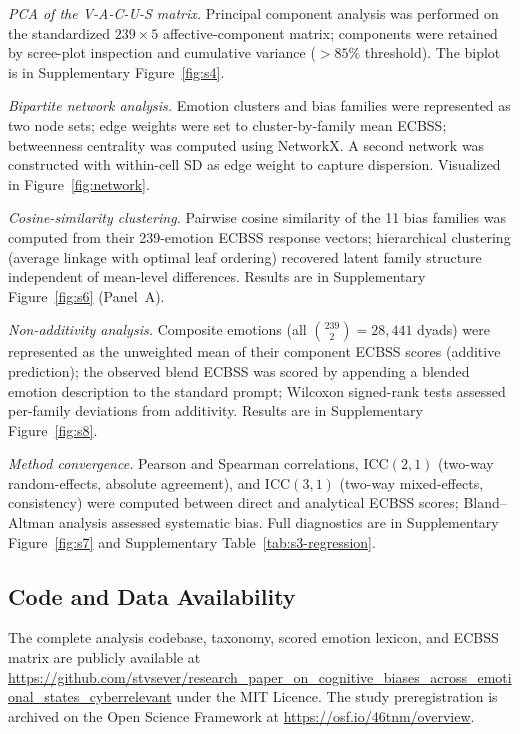 \documentclass[12pt,a4paper]{article}
\newcommand{\ecbss}{\textsc{ECBSS}}
\newcommand{\vacus}{V-A-C-U-S}
\begin{document}
\emph{PCA of the \vacus{} matrix.} Principal component analysis was performed on the standardized $239 \times 5$ affective-component matrix; components were retained by scree-plot inspection and cumulative variance ($> 85\%$ threshold). The biplot is in Supplementary Figure~\ref{fig:s4}.

\emph{Bipartite network analysis.} Emotion clusters and bias families were represented as two node sets; edge weights were set to cluster-by-family mean \ecbss{}; betweenness centrality was computed using NetworkX. A second network was constructed with within-cell SD as edge weight to capture dispersion. Visualized in Figure~\ref{fig:network}.

\emph{Cosine-similarity clustering.} Pairwise cosine similarity of the 11 bias families was computed from their 239-emotion \ecbss{} response vectors; hierarchical clustering (average linkage with optimal leaf ordering) recovered latent family structure independent of mean-level differences. Results are in Supplementary Figure~\ref{fig:s6} (Panel~A).

\emph{Non-additivity analysis.} Composite emotions (all $\binom{239}{2} = 28{,}441$ dyads) were represented as the unweighted mean of their component \ecbss{} scores (additive prediction); the observed blend \ecbss{} was scored by appending a blended emotion description to the standard prompt; Wilcoxon signed-rank tests assessed per-family deviations from additivity. Results are in Supplementary Figure~\ref{fig:s8}.

\emph{Method convergence.} Pearson and Spearman correlations, ICC$(2,1)$ (two-way random-effects, absolute agreement), and ICC$(3,1)$ (two-way mixed-effects, consistency) were computed between direct and analytical \ecbss{} scores; Bland--Altman analysis assessed systematic bias. Full diagnostics are in Supplementary Figure~\ref{fig:s7} and Supplementary Table~\ref{tab:s3-regression}.

\subsection{Code and Data Availability}

The complete analysis codebase, taxonomy, scored emotion lexicon, and \ecbss{} matrix are publicly available at \url{https://github.com/stvsever/research_paper_on_cognitive_biases_across_emotional_states_cyberrelevant} under the MIT Licence. The study preregistration is archived on the Open Science Framework at \url{https://osf.io/46tnm/overview}.
\end{document}
